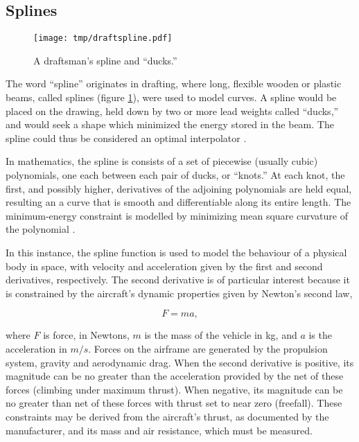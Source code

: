 \documentclass[doc]{apa6}
\begin{document}
\subsection{Splines}

\begin{figure} %
\texttt{[image: tmp/draftspline.pdf]} 
\caption{A draftsman's spline and ``ducks.'' \parencite{DeBoor2006}}
\label{fig:spline}
\end{figure}

The word ``spline'' originates in drafting, where long, flexible wooden or plastic beams, called splines (figure \ref{fig:spline}), were used to model curves. A spline would be placed on the drawing, held down by two or more lead weights called ``ducks,'' and would seek a shape which minimized the energy stored in the beam. The spline could thus be considered an optimal interpolator \parencite{Wegman2016}. 

In mathematics, the spline is consists of a set of piecewise (usually cubic) polynomials, one each between each pair of ducks, or ``knots.'' At each knot, the first, and possibly higher, derivatives of the adjoining polynomials are held equal, resulting an a curve that is smooth and differentiable along its entire length. The minimum-energy constraint is modelled by minimizing mean square curvature of the polynomial \parencite{Wegman2016}.

In this instance, the spline function is used to model the behaviour of a physical body in space, with velocity and acceleration given by the first and second derivatives, respectively. The second derivative is of particular interest because it is constrained by the aircraft's dynamic properties given by Newton's second law,

\begin{equation}
F = ma,
\end{equation} 

where $F$ is force, in Newtons, $m$ is the mass of the vehicle in kg, and $a$ is the acceleration in $m/s$. Forces on the airframe are generated by the propulsion system, gravity and aerodynamic drag. When the second derivative is positive, its magnitude can be no greater than the acceleration provided by the net of these forces (climbing under maximum thrust). When negative, its magnitude can be no greater than net of these forces with thrust set to near zero (freefall). These constraints may be derived from the aircraft's thrust, as documented by the manufacturer, and its mass and air resistance, which must be measured. 
\end{document}
